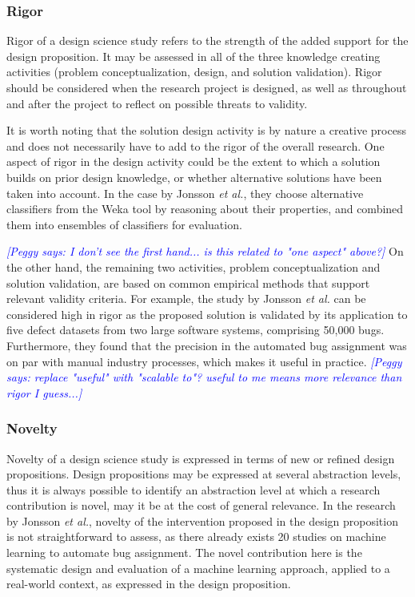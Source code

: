 \documentclass[graybox]{svmult}
\newcommand{\peggy}[1]{\textcolor{blue}{{\it [Peggy says: #1]}}}
\newcommand{\peggy}[1]{}
\begin{document}
\subsubsection{Rigor} 
Rigor of a design science study refers to the strength of the added support for the design proposition. It may be assessed in all of the three knowledge creating activities (problem conceptualization, design, and solution validation). 
Rigor should be considered when the research project is designed, as well as throughout and after the project to reflect on possible threats to validity. 

It is worth noting that the solution design activity is by nature a creative process and does not necessarily have to add to the rigor of the overall research. One aspect of rigor in the design activity could be the extent to which a solution builds on prior design knowledge, or whether alternative solutions have been taken into account. 
In the case by Jonsson \emph{et al.}, they choose alternative classifiers from the Weka tool by reasoning about their properties, and combined them into ensembles of classifiers for evaluation.

\peggy{I don't see the first hand... is this related to "one aspect" above?}
On the other hand, the remaining two activities, problem conceptualization and solution validation, are based on common empirical methods that support relevant validity criteria. For example, the study by Jonsson \emph{et al.} can be considered high in rigor as the proposed solution is validated by its application to five defect datasets from two large software systems, comprising 50,000 bugs. Furthermore, they found that the precision in the automated bug assignment was on par with manual industry processes, which makes it useful in practice.
\peggy{replace "useful" with "scalable to"? useful to me means more relevance than rigor I guess...}

\subsubsection{Novelty} 
Novelty of a design science study is expressed in terms of new or refined design propositions. Design propositions may be expressed at several abstraction levels, thus it is always possible to identify an abstraction level at which a research contribution is novel, may it be at the cost of general relevance. In the research by Jonsson \emph{et al.}, novelty of the intervention proposed in the design proposition is not straightforward to assess, as there already exists 20 studies on machine learning to automate bug assignment. The novel contribution here is the systematic design and evaluation of a machine learning approach, applied to a real-world context, as expressed in the design proposition.
\end{document}
